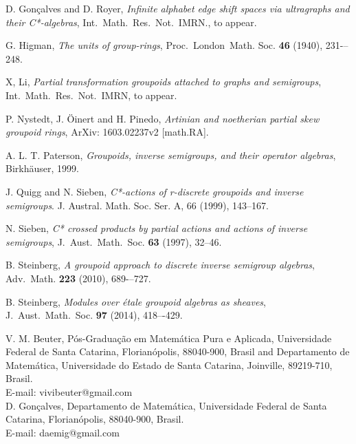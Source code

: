 \documentclass[11pt, a4paper]{amsart}
\theoremstyle{plain}
\begin{document}
\begin{thebibliography}{99}
 D. Gonçalves and D. Royer, {\it Infinite alphabet edge shift spaces via ultragraphs and their C*-algebras}, Int.\ Math.\ Res.\ Not.\ IMRN., to appear.

 G. Higman, \textit{The units of group-rings}, Proc.\ London\ Math. Soc. {\bf 46} (1940), 231-–248.

 X, Li, \textit{Partial transformation groupoids attached to graphs and semigroups}, Int.\ Math.\ Res.\ Not.\ IMRN, to appear. 

 P. Nystedt, J. Öinert and H. Pinedo, \textit{Artinian and noetherian partial skew groupoid rings},  ArXiv: 1603.02237v2 [math.RA].

 A. L. T. Paterson, \textit{Groupoids, inverse semigroups, and their operator algebras}, Birkhäuser, 1999.

 J. Quigg and N. Sieben, \textit{C*-actions of r-discrete groupoids and inverse semigroups}. J. Austral.
Math. Soc. Ser. A, 66 (1999), 143--167.

 N. Sieben, \textit{C* crossed products by partial actions and actions of inverse semigroups}, J.\ Aust.\ Math.\ Soc.  {\bf 63} (1997), 32--46.

  B. Steinberg, \textit{A groupoid approach to discrete inverse semigroup algebras}, Adv.\ Math. {\bf 223} (2010), 689-–727.

 B. Steinberg, \textit{Modules over étale groupoid algebras as sheaves}, J.\ Aust.\ Math.\ Soc. {\bf 97} (2014), 418–-429.\\

\end{thebibliography}


\noindent V. M. Beuter, Pós-Graduação em Matemática Pura e Aplicada, Universidade Federal de Santa Catarina, Florianópolis, 88040-900, Brasil and Departamento de Matemática, Universidade do Estado de Santa Catarina, Joinville, 89219-710, Brasil.\\ 
E-mail: vivibeuter@gmail.com \\

\noindent D. Gonçalves, Departamento de Matemática, Universidade Federal de Santa Catarina, Florianópolis, 88040-900, Brasil.\\
E-mail: daemig@gmail.com
\end{document}
